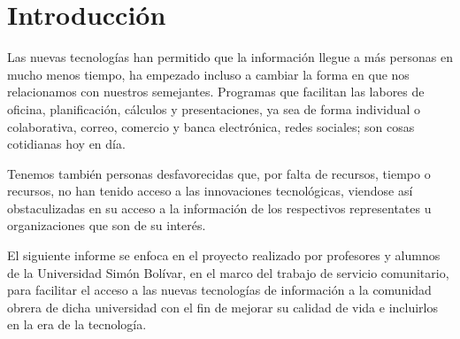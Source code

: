 	\chapter*{Introducción}
    
    Las nuevas tecnologías han permitido que la información llegue a más personas en mucho menos tiempo, ha empezado incluso a cambiar la forma en que nos relacionamos con nuestros semejantes. Programas que facilitan las labores de oficina, planificación, cálculos y presentaciones, ya sea de forma individual o colaborativa, correo, comercio y banca electrónica, redes sociales; son cosas cotidianas hoy en día.
    
    Tenemos también personas desfavorecidas que, por falta de recursos, tiempo o recursos, no han tenido acceso a las innovaciones tecnológicas, viendose así obstaculizadas en su acceso a la información de los respectivos representates u organizaciones que son de su interés.
    
    El siguiente informe se enfoca en el proyecto realizado por profesores y alumnos de la Universidad Simón Bolívar, en el marco del trabajo de servicio comunitario, para facilitar el acceso a las nuevas tecnologías de información a la comunidad obrera de dicha universidad con el fin de mejorar su calidad de vida e incluirlos en la era de la tecnología.
    
	\pagebreak